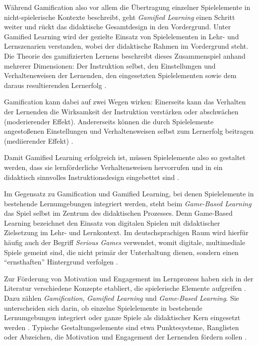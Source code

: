 Während Gamification also vor allem die Übertragung einzelner Spielelemente in nicht-spielerische Kontexte beschreibt, geht \textit{Gamified Learning} einen Schritt weiter und rückt das didaktische Gesamtdesign in den Vordergrund. Unter Gamified Learning wird der gezielte Einsatz von Spielelementen in Lehr- und Lernszenarien verstanden, wobei der didaktische Rahmen im Vordergrund steht. Die Theorie des gamifizierten Lernens beschreibt dieses Zusammenspiel anhand mehrerer Dimensionen: Der Instruktion selbst, den Einstellungen und Verhaltensweisen der Lernenden, den eingesetzten Spielelementen sowie dem daraus resultierenden Lernerfolg \parencites[S.~6f]{landers_developing_2014}[S.~453]{schlag_gamifizierung_2021}.

Gamification kann dabei auf zwei Wegen wirken: Einerseits kann das Verhalten der Lernenden die Wirksamkeit der Instruktion verstärken oder abschwächen (moderierender Effekt). Andererseits können die durch Spielelemente angestoßenen Einstellungen und Verhaltensweisen selbst zum Lernerfolg beitragen (mediierender Effekt) \parencites[S.~6f]{landers_developing_2014}[S.~453]{schlag_gamifizierung_2021}.

Damit Gamified Learning erfolgreich ist, müssen Spielelemente also so gestaltet werden, dass sie lernförderliche Verhaltensweisen hervorrufen und in ein didaktisch sinnvolles Instruktionsdesign eingebettet sind \parencites[S.~6f]{landers_developing_2014}[S.~453]{schlag_gamifizierung_2021}.

Im Gegensatz zu Gamification und Gamified Learning, bei denen Spielelemente in bestehende Lernumgebungen integriert werden, steht beim \textit{Game-Based Learning} das Spiel selbst im Zentrum des didaktischen Prozesses. Denn Game-Based Learning bezeichnet den Einsatz von digitalen Spielen mit didaktischer Zielsetzung im Lehr- und Lernkontext. Im deutschsprachigen Raum wird hierfür häufig auch der Begriff \textit{Serious Games} verwendet, womit digitale, multimediale Spiele gemeint sind, die nicht primär der Unterhaltung dienen, sondern einen \enquote{ernsthaften} Hintergrund verfolgen \parencite[S.~14]{niegemann_kompendium_2008}. 
\fi

Zur Förderung von Motivation und Engagement im Lernprozess haben sich in der Literatur verschiedene Konzepte etabliert, die spielerische Elemente aufgreifen \parencite[S.~485]{triantafyllou_gamification_2025}. Dazu zählen \textit{Gamification}, \textit{Gamified Learning} und \textit{Game-Based Learning}. Sie unterscheiden sich darin, ob einzelne Spielelemente in bestehende Lernumgebungen integriert oder ganze Spiele als didaktischer Kern eingesetzt werden \parencites[S.~2]{deterding_gamification_2011}[S.~14]{niegemann_kompendium_2008}. Typische Gestaltungselemente sind etwa Punktesysteme, Ranglisten oder Abzeichen, die Motivation und Engagement der Lernenden fördern sollen \parencite[S.~2f]{hamari_does_2014}. 

